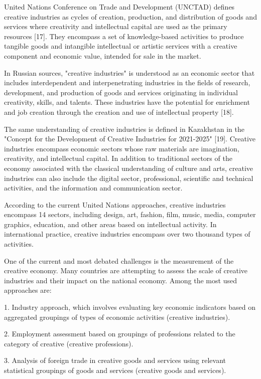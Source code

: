 United Nations Conference on Trade and Development (UNCTAD) defines
creative industries as cycles of creation, production, and distribution
of goods and services where creativity and intellectual capital are used
as the primary resources {[}17{]}. They encompass a set of
knowledge-based activities to produce tangible goods and intangible
intellectual or artistic services with a creative component and economic
value, intended for sale in the market.

In Russian sources, "creative industries" is understood as an economic
sector that includes interdependent and interpenetrating industries in
the fields of research, development, and production of goods and
services originating in individual creativity, skills, and talents.
These industries have the potential for enrichment and job creation
through the creation and use of intellectual property {[}18{]}.

The same understanding of creative industries is defined in Kazakhstan
in the "Concept for the Development of Creative Industries for
2021-2025" {[}19{]}. Creative industries encompass economic sectors
whose raw materials are imagination, creativity, and intellectual
capital. In addition to traditional sectors of the economy associated
with the classical understanding of culture and arts, creative
industries can also include the digital sector, professional, scientific
and technical activities, and the information and communication sector.

According to the current United Nations approaches, creative industries
encompass 14 sectors, including design, art, fashion, film, music,
media, computer graphics, education, and other areas based on
intellectual activity. In international practice, creative industries
encompass over two thousand types of activities.

One of the current and most debated challenges is the measurement of the
creative economy. Many countries are attempting to assess the scale of
creative industries and their impact on the national economy. Among the
most used approaches are:

1. Industry approach, which involves evaluating key economic indicators
based on aggregated groupings of types of economic activities (creative
industries).

2. Employment assessment based on groupings of professions related to
the category of creative (creative professions).

3. Analysis of foreign trade in creative goods and services using
relevant statistical groupings of goods and services (creative goods and
services).

